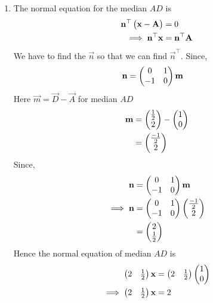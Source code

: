 \documentclass[11pt]{book}
\begin{document}
\begin{enumerate}[label=\thesection.\arabic*.,ref=\thesection.\theenumi]
\begin{enumerate}
 \item The normal equation for the median $AD$ is
  \begin{align}
    \mathbf{n}^{\top}\begin{pmatrix}\mathbf{x}-\mathbf{A}\end{pmatrix}&=0\\
    \implies
    \mathbf{n}^{\top}\mathbf{x}&=\mathbf{n}^{\top}\mathbf{A}
  \end{align}
 We have to find the $\vec{n}$ so that we can find $\vec{n}^{\top}$.
 Since,
\begin{align}
  \mathbf{n} &= \begin{pmatrix}0 & 1\\
  -1 & 0\end{pmatrix}\mathbf{m}
\end{align}
Here $\vec{m} = \vec{D}- \vec{A}$ for median $AD$
\begin{align}
\mathbf{m}&=\begin{pmatrix}\frac{1}{2}\\ 2\end{pmatrix} - \begin{pmatrix}1\\0\end{pmatrix}\\
       &=\begin{pmatrix}\frac{-1}{2}\\2\end{pmatrix}
\end{align}
Since,
\begin{align}
  \mathbf{n} &= \begin{pmatrix}0 & 1\\
  -1 & 0\end{pmatrix}\mathbf{m}\\
\implies
\mathbf{n} &= \begin{pmatrix}0 & 1\\
  -1 & 0\end{pmatrix}\begin{pmatrix}\frac{-1}{2}\\2\end{pmatrix}\\
        &= \begin{pmatrix}2 \\\frac{1}{2}\end{pmatrix}
\end{align}
Hence the normal equation of median $AD$ is 
\begin{align}
    \begin{pmatrix}2 & \frac{1}{2}\end{pmatrix}\mathbf{x}&=\begin{pmatrix}2 & \frac{1}{2}\end{pmatrix}\begin{pmatrix}1\\0\end{pmatrix}\\
    \implies
    \begin{pmatrix}2 & \frac{1}{2}\end{pmatrix}\mathbf{x}&={2}
\end{align}


\end{enumerate}
\end{enumerate}
\end{document}
